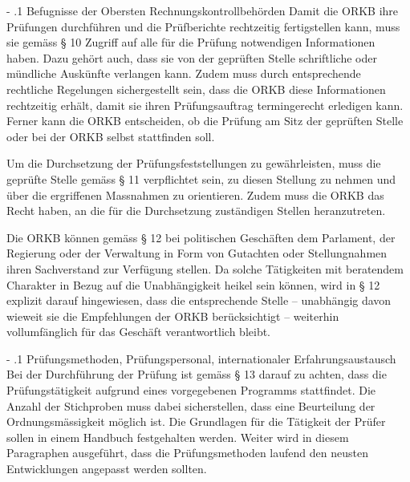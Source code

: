 \documentclass[10pt]{article}
\makeatletter
\renewcommand\paragraph{\@startsection{paragraph}{3}{0mm}{-\baselineskip}{.1\baselineskip}{\normalfont\normalsize\bfseries}}
\renewcommand\paragraph{%
\@startsection{paragraph}{3}{0mm}%
{-\baselineskip}%
{.1\baselineskip}%
{\normalfont\normalsize\bfseries}}
\makeatother
\begin{document}
\paragraph{Befugnisse der Obersten Rechnungskontrollbehörden}\label{para:befugnisse_der_obersten_rechnungskontrollbehoerden}
Damit die ORKB ihre Prüfungen durchführen und die Prüfberichte rechtzeitig fertigstellen kann, muss sie gemäss § 10 Zugriff auf alle für die Prüfung notwendigen Informationen haben. Dazu gehört auch, dass sie von der geprüften Stelle schriftliche oder mündliche Auskünfte verlangen kann. Zudem muss durch entsprechende rechtliche Regelungen sichergestellt sein, dass die ORKB diese Informationen rechtzeitig erhält, damit sie ihren Prüfungsauftrag termingerecht erledigen kann. Ferner kann die ORKB entscheiden, ob die Prüfung am Sitz der geprüften Stelle oder bei der ORKB selbst stattfinden soll.

Um die Durchsetzung der Prüfungsfeststellungen zu gewährleisten, muss die geprüfte Stelle gemäss § 11 verpflichtet sein, zu diesen Stellung zu nehmen und über die ergriffenen Massnahmen zu orientieren. Zudem muss die ORKB das Recht haben, an die für die Durchsetzung zuständigen Stellen heranzutreten.

Die ORKB können gemäss § 12 bei politischen Geschäften dem Parlament, der Regierung oder der Verwaltung in Form von Gutachten oder Stellungnahmen ihren Sachverstand zur Verfügung stellen. Da solche Tätigkeiten mit beratendem Charakter in Bezug auf die Unabhängigkeit heikel sein können, wird in § 12 explizit darauf hinge­wiesen, dass die entsprechende Stelle -- unabhängig davon wieweit sie die Empfehlungen der ORKB berücksichtigt -- weiterhin vollumfänglich für das Geschäft verantwortlich bleibt.

\paragraph{Prüfungsmethoden, Prüfungspersonal, internationaler Erfahrungsaustausch}\label{para:pruefungsmethoden__pruefungspersonal__internationaler_erfahrungsaustausch}
Bei der Durchführung der Prüfung ist gemäss § 13 darauf zu achten, dass die Prüfungstätigkeit aufgrund eines vorgegebenen Programms stattfindet. Die Anzahl der Stichproben muss dabei sicherstellen, dass eine Beurteilung der Ordnungsmässigkeit möglich ist. Die Grundlagen für die Tätigkeit der Prüfer sollen in einem Handbuch festgehalten werden. Weiter wird in diesem Paragraphen ausgeführt, dass die Prüfungs­methoden laufend den neusten Entwicklungen angepasst werden sollten.
\end{document}
